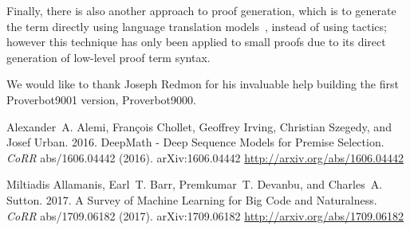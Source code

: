 \documentclass[sigplan,screen]{acmart}
\newcommand{\name}{Proverbot9001\xspace}
\renewcommand{\>}{\quad}
\begin{document}
Finally, there is also another approach to proof generation, which is to generate
the term directly using language translation models~\cite{proof-translation},
instead of using tactics; however this technique has only been applied to small
proofs due to its direct generation of low-level proof term syntax.
 
\begin{acks}
  We would like to thank Joseph Redmon for his invaluable help building the first \name{} version, Proverbot9000.
\end{acks}




\begin{thebibliography}{41}



\ifx \showCODEN    \undefined {}     \fi
\ifx \showDOI      \undefined \def \showDOI       #1{#1}\fi
\ifx \showISBNx    \undefined \def \showISBNx     #1{\unskip}     \fi
\ifx \showISBNxiii \undefined \def \showISBNxiii  #1{\unskip}     \fi
\ifx \showISSN     \undefined \def \showISSN      #1{\unskip}     \fi
\ifx \showLCCN     \undefined \def \showLCCN      #1{\unskip}     \fi
\ifx \shownote     \undefined \def \shownote      #1{#1}          \fi
\ifx \showarticletitle \undefined \def \showarticletitle #1{#1}   \fi
\ifx \showURL      \undefined \def \showURL       {\relax}        \fi
\providecommand\bibfield[2]{#2}
\providecommand\bibinfo[2]{#2}
\providecommand\natexlab[1]{#1}
\providecommand\showeprint[2][]{arXiv:#2}

\bibfield{author}{\bibinfo{person}{Alexander~A. Alemi},
  \bibinfo{person}{Fran{\c{c}}ois Chollet}, \bibinfo{person}{Geoffrey Irving},
  \bibinfo{person}{Christian Szegedy}, {and} \bibinfo{person}{Josef Urban}.}
  \bibinfo{year}{2016}\natexlab{}.
\newblock \showarticletitle{DeepMath - Deep Sequence Models for Premise
  Selection}.
\newblock \bibinfo{journal}{\emph{CoRR}}  \bibinfo{volume}{abs/1606.04442}
  (\bibinfo{year}{2016}).
\newblock
\showeprint[arxiv]{1606.04442}
\urldef\tempurl \url{http://arxiv.org/abs/1606.04442}
\showURL{\tempurl}


\bibfield{author}{\bibinfo{person}{Miltiadis Allamanis},
  \bibinfo{person}{Earl~T. Barr}, \bibinfo{person}{Premkumar~T. Devanbu}, {and}
  \bibinfo{person}{Charles~A. Sutton}.} \bibinfo{year}{2017}\natexlab{}.
\newblock \showarticletitle{A Survey of Machine Learning for Big Code and
  Naturalness}.
\newblock \bibinfo{journal}{\emph{CoRR}}  \bibinfo{volume}{abs/1709.06182}
  (\bibinfo{year}{2017}).
\newblock
\showeprint[arxiv]{1709.06182}
\urldef\tempurl \url{http://arxiv.org/abs/1709.06182}
\showURL{\tempurl}



\end{thebibliography}
\end{document}
